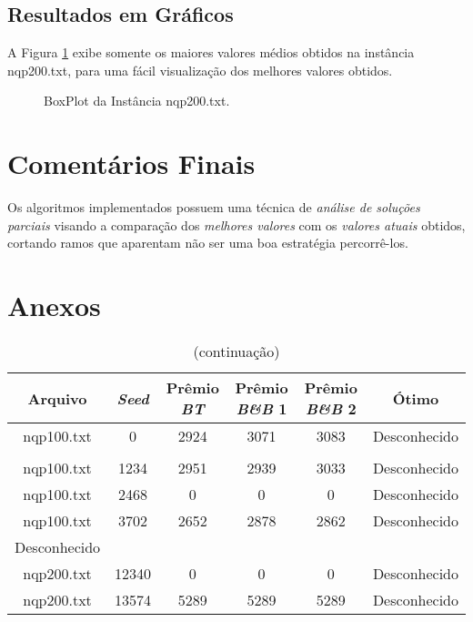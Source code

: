 \documentclass[12pt]{article}
\begin{document}
	\subsection{Resultados em Gráficos}

	A Figura \ref{fig:200-2} exibe somente os maiores valores médios obtidos na instância nqp200.txt, para uma fácil visualização dos melhores valores obtidos.

	\begin{figure}[H]
		\centering
		\caption{BoxPlot da Instância nqp200.txt.}
		\label{fig:200-2}
	\end{figure}


\section{Comentários Finais}\label{sec:figs}
	Os algoritmos implementados possuem uma técnica de \textit{análise de soluções parciais} visando a comparação dos \textit{melhores valores} com os \textit{valores atuais} obtidos, cortando ramos que aparentam não ser uma boa estratégia percorrê-los.

%




\newpage
\section{Anexos} \label{sec:anexo}

{ \scriptsize
	\begin{longtable}{c|c|cccc}
		\caption{Tabela com todos os valores obtidos.} \label{tab:resulAll} \\

		\hline
		Arquivo  & \textit{Seed} & Prêmio \textit{BT} & Prêmio \textit{B\&B} 1 & Prêmio \textit{B\&B} 2 & Ótimo \\ \hline
		nqp100.txt    &   0       &   2924   &   3071   &   3083   & Desconhecido \\
		\caption[]{(continuação)}\\
		nqp100.txt    &   1234    &   2951   &   2939   &   3033   & Desconhecido \\
		nqp100.txt    &   2468    &   0      &   0      &   0      & Desconhecido \\
		nqp100.txt    &   3702    &   2652   &   2878   &   2862   & Desconhecido \\ Desconhecido \\
		nqp200.txt    &   12340   &   0      &   0      &   0      & Desconhecido \\
		nqp200.txt    &   13574   &   5289   &   5289   &   5289   & Desconhecido \\ \hline

	\end{longtable}
}
\end{document}
